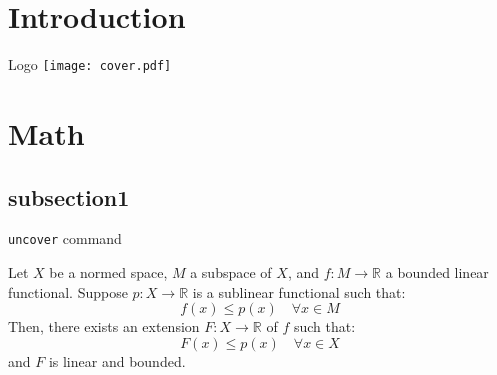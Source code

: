\documentclass[
    ref = refDemo,
    style = 0,
    sectionpagestyle = 1
]{spBeamer}
\begin{document}
    \section{Introduction}
        \begin{frame}{Logo}
                \texttt{[image: cover.pdf]}
        \end{frame}

    \section{Math}
        \subsection{subsection1}
            \begin{frame}{\texttt{uncover} command}
            \end{frame}

            \begin{frame}
                \begin{theorem}
                    Let \( X \) be a normed space, \( M \) a subspace of \( X \), and \( f: M \to \mathbb{R} \) a bounded linear functional. Suppose \( p: X \to \mathbb{R} \) is a sublinear functional such that:
                    \[
                    f(x) \leq p(x) \quad \forall x \in M
                    \]
                    Then, there exists an extension \( F: X \to \mathbb{R} \) of \( f \) such that:
                    \[
                    F(x) \leq p(x) \quad \forall x \in X
                    \]
                    and \( F \) is linear and bounded.
                \end{theorem}
            \end{frame}
\end{document}
